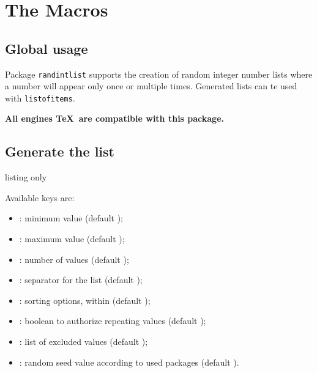 \documentclass[11pt,a4paper]{ltxdoc}
\begin{document}
\section{The Macros}

\subsection{Global usage}

Package \texttt{randintlist} supports the creation of random integer number lists where a number will appear only once or multiple times. Generated lists can te used with \texttt{listofitems}.

\hfill\textbf{All engines \TeX\ are compatible with this package.}\hfill~

\subsection{Generate the list}

\begin{DemoCode}{listing only}
\randintlist[keys]{\macro}
\end{DemoCode}

Available keys are:

\begin{itemize}
	\item {}: minimum value (default );
	\item {}: maximum value (default );
	\item {}: number of values (default );
	\item {}: separator for the list (default \ShowCode{,});
	\item {}: sorting options, within  (default );
	\item {}: boolean to authorize repeating values (default );
	\item {}: list of excluded values (default );
	\item {}: random seed value according to used packages (default \ShowCode{-}).
\end{itemize}

\begin{DemoCode}{}
\randintlist{\mylistA}\mylistA
\end{DemoCode}

\begin{DemoCode}{}
\randintlist[sort=asc,min=1,max=50,nb=10]{\mylistB}\mylistB
\end{DemoCode}
\end{document}
